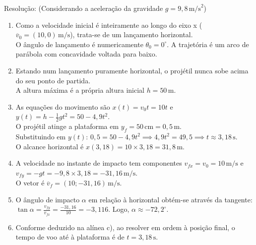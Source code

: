 \documentclass[12pt]{article}
\begin{document}
	\vspace{0.4cm}
	Resolução:
	(Considerando a aceleração da gravidade $g = 9,8\,\text{m/s}^2$)
	\begin{enumerate}[label=\alph*), itemsep=12pt]
		\item Como a velocidade inicial é inteiramente ao longo do eixo x ($\overline{v}_0 = (10,0)\,\text{m/s}$), trata-se de um lançamento horizontal. \\
		O ângulo de lançamento é numericamente $\theta_0 = 0^\circ$. A trajetória é um arco de parábola com concavidade voltada para baixo.
		
		\item Estando num lançamento puramente horizontal, o projétil nunca sobe acima do seu ponto de partida. \\
		A altura máxima é a própria altura inicial $h = 50\,\text{m}$.
		
		\item As equações do movimento são $x(t) = v_0 t = 10t$ e $y(t) = h - \frac{1}{2}gt^2 = 50 - 4,9t^2$. \\
		O projétil atinge a plataforma em $y_f = 50\,\text{cm} = 0,5\,\text{m}$. \\
		Substituindo em $y(t)$: $0,5 = 50 - 4,9t^2 \implies 4,9t^2 = 49,5 \implies t \approx 3,18\,\text{s}$. \\
		O alcance horizontal é $x(3,18) = 10 \times 3,18 = 31,8\,\text{m}$.
		
		\item A velocidade no instante de impacto tem componentes $v_{fx} = v_0 = 10\,\text{m/s}$ e $v_{fy} = -gt = -9,8 \times 3,18 = -31,16\,\text{m/s}$. \\
		O vetor é $\overline{v}_f = (10; -31,16)\,\text{m/s}$.
		
		\item O ângulo de impacto $\alpha$ em relação à horizontal obtém-se através da tangente: \\
		$\tan \alpha = \frac{v_{fy}}{v_{fx}} = \frac{-31,16}{10} = -3,116$. Logo, $\alpha \approx -72,2^\circ$.
		
		\item Conforme deduzido na alínea c), ao resolver em ordem à posição final, o tempo de voo até à plataforma é de $t = 3,18\,\text{s}$.
	\end{enumerate}
	
\end{document}
